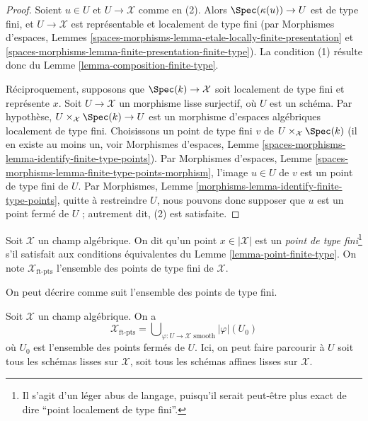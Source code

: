 \begin{proof}
Soient $u \in U$ et $U \to \mathcal{X}$ comme en (2). Alors
$\Spec(\kappa(u)) \to U$ est de type fini, et $U \to \mathcal{X}$ est
représentable et localement de type fini (par Morphismes d'espaces,
Lemmes \ref{spaces-morphisms-lemma-etale-locally-finite-presentation} et
\ref{spaces-morphisms-lemma-finite-presentation-finite-type}).
La condition (1) résulte donc du
Lemme \ref{lemma-composition-finite-type}.

\medskip\noindent
Réciproquement, supposons que $\Spec(k) \to \mathcal{X}$ soit localement de
type fini et représente $x$. Soit $U \to \mathcal{X}$ un morphisme lisse
surjectif, où $U$ est un schéma. Par hypothèse,
$U \times_\mathcal{X} \Spec(k) \to U$ est un morphisme d'espaces algébriques
localement de type fini. Choisissons un point de type fini $v$ de
$U \times_\mathcal{X} \Spec(k)$ (il en existe au moins un, voir Morphismes
d'espaces, Lemme \ref{spaces-morphisms-lemma-identify-finite-type-points}).
Par Morphismes d'espaces,
Lemme \ref{spaces-morphisms-lemma-finite-type-points-morphism},
l'image $u \in U$ de $v$ est un point de type fini de $U$.
Par Morphismes, Lemme \ref{morphisms-lemma-identify-finite-type-points},
quitte à restreindre $U$, nous pouvons donc supposer que $u$ est un point
fermé de $U$ ; autrement dit, (2) est satisfaite.
\end{proof}

\begin{definition}
\label{definition-finite-type-point}
Soit $\mathcal{X}$ un champ algébrique. On dit qu'un point
$x \in |\mathcal{X}|$ est un {\it point de type fini}\footnote{Il s'agit
d'un léger abus de langage, puisqu'il serait peut-être plus exact de dire
``point localement de type fini''.} s'il satisfait aux conditions équivalentes
du Lemme \ref{lemma-point-finite-type}. On note
$\mathcal{X}_{\text{ft-pts}}$ l'ensemble des points de type fini de
$\mathcal{X}$.
\end{definition}

\noindent
On peut décrire comme suit l'ensemble des points de type fini.

\begin{lemma}
\label{lemma-identify-finite-type-points}
Soit $\mathcal{X}$ un champ algébrique. On a
$$
\mathcal{X}_{\text{ft-pts}} =
\bigcup\nolimits_{\varphi : U \to \mathcal{X}\text{ smooth}} |\varphi|(U_0)
$$
où $U_0$ est l'ensemble des points fermés de $U$.
Ici, on peut faire parcourir à $U$ soit tous les schémas lisses sur
$\mathcal{X}$, soit tous les schémas affines lisses sur $\mathcal{X}$.
\end{lemma}

